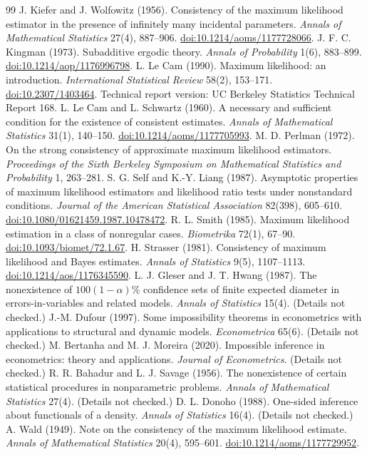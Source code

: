 \documentclass[11pt]{article}
\newcommand{\doi}[1]{\href{https://doi.org/#1}{doi:#1}}
\theoremstyle{definition}
\theoremstyle{remark}
\begin{document}
\begin{thebibliography}{99}
 J. Kiefer and J. Wolfowitz (1956). Consistency of the maximum
likelihood estimator in the presence of infinitely many incidental
parameters. \emph{Annals of Mathematical Statistics} 27(4), 887--906.
\doi{10.1214/aoms/1177728066}.
 J. F. C. Kingman (1973). Subadditive ergodic theory.
\emph{Annals of Probability} 1(6), 883--899. \doi{10.1214/aop/1176996798}.
 L. Le Cam (1990). Maximum likelihood: an introduction.
\emph{International Statistical Review} 58(2), 153--171.
\doi{10.2307/1403464}. Technical report version: UC Berkeley Statistics
Technical Report 168.
 L. Le Cam and L. Schwartz (1960). A necessary and
sufficient condition for the existence of consistent estimates.
\emph{Annals of Mathematical Statistics} 31(1), 140--150.
\doi{10.1214/aoms/1177705993}.
 M. D. Perlman (1972). On the strong consistency of
approximate maximum likelihood estimators. \emph{Proceedings of the Sixth
Berkeley Symposium on Mathematical Statistics and Probability} 1, 263--281.
 S. G. Self and K.-Y. Liang (1987). Asymptotic properties
of maximum likelihood estimators and likelihood ratio tests under
nonstandard conditions. \emph{Journal of the American Statistical
Association} 82(398), 605--610. \doi{10.1080/01621459.1987.10478472}.
 R. L. Smith (1985). Maximum likelihood estimation in a class
of nonregular cases. \emph{Biometrika} 72(1), 67--90.
\doi{10.1093/biomet/72.1.67}.
 H. Strasser (1981). Consistency of maximum likelihood and
Bayes estimates. \emph{Annals of Statistics} 9(5), 1107--1113.
\doi{10.1214/aos/1176345590}.
 L. J. Gleser and J. T. Hwang (1987). The nonexistence
of $100(1-\alpha)\%$ confidence sets of finite expected diameter in
errors-in-variables and related models. \emph{Annals of Statistics} 15(4).
(Details not checked.)
 J.-M. Dufour (1997). Some impossibility theorems in
econometrics with applications to structural and dynamic models.
\emph{Econometrica} 65(6). (Details not checked.)
 M. Bertanha and M. J. Moreira (2020). Impossible
inference in econometrics: theory and applications. \emph{Journal of
Econometrics}. (Details not checked.)
 R. R. Bahadur and L. J. Savage (1956). The
nonexistence of certain statistical procedures in nonparametric problems.
\emph{Annals of Mathematical Statistics} 27(4). (Details not checked.)
 D. L. Donoho (1988). One-sided inference about
functionals of a density. \emph{Annals of Statistics} 16(4). (Details not
checked.)
 A. Wald (1949). Note on the consistency of the maximum
likelihood estimate. \emph{Annals of Mathematical Statistics} 20(4),
595--601. \doi{10.1214/aoms/1177729952}.
\end{thebibliography}
\end{document}

